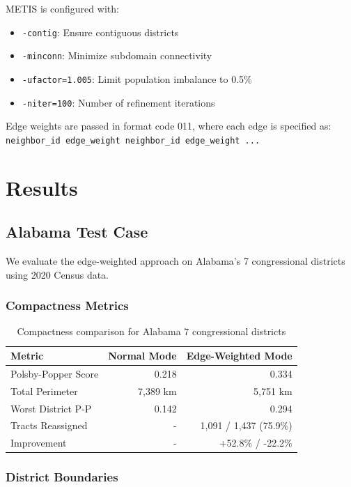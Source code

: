 \documentclass[11pt]{article}
\begin{document}
METIS is configured with:
\begin{itemize}
\item \texttt{-contig}: Ensure contiguous districts
\item \texttt{-minconn}: Minimize subdomain connectivity
\item \texttt{-ufactor=1.005}: Limit population imbalance to 0.5\%
\item \texttt{-niter=100}: Number of refinement iterations
\end{itemize}

Edge weights are passed in format code 011, where each edge is specified as: \\
\texttt{neighbor\_id edge\_weight neighbor\_id edge\_weight ...}

\section{Results}

\subsection{Alabama Test Case}

We evaluate the edge-weighted approach on Alabama's 7 congressional districts using 2020 Census data.

\subsubsection{Compactness Metrics}

\begin{table}[h]
\centering
\begin{tabular}{lrr}
\toprule
Metric & Normal Mode & Edge-Weighted Mode \\
\midrule
Polsby-Popper Score & 0.218 & 0.334 \\
Total Perimeter & 7,389 km & 5,751 km \\
Worst District P-P & 0.142 & 0.294 \\
Tracts Reassigned & - & 1,091 / 1,437 (75.9\%) \\
\midrule
Improvement & - & +52.8\% / -22.2\% \\
\bottomrule
\end{tabular}
\caption{Compactness comparison for Alabama 7 congressional districts}
\end{table}

\subsubsection{District Boundaries}
\end{document}
